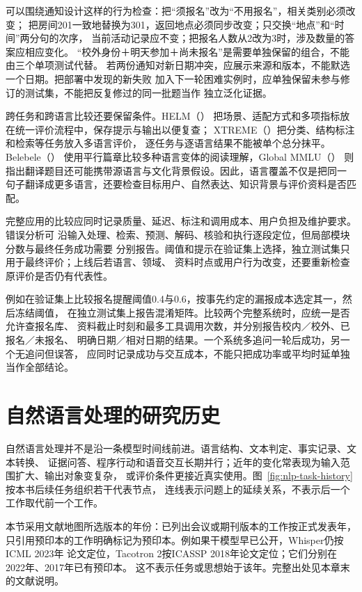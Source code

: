可以围绕通知设计这样的行为检查：把“须报名”改为“不用报名”，相关类别必须改变；
把房间201一致地替换为301，返回地点必须同步改变；只交换“地点”和“时间”两分句的次序，
当前活动记录应不变；把报名人数从2改为3时，涉及数量的答案应相应变化。
“校外身份＋明天参加＋尚未报名”是需要单独保留的组合，不能由三个单项测试代替。
若两份通知对新日期冲突，应展示来源和版本，不能默选一个日期。把部署中发现的新失败
加入下一轮困难实例时，应单独保留未参与修订的测试集，不能把反复修过的同一批题当作
独立泛化证据。

跨任务和跨语言比较还要保留条件。HELM（\citeyear{nlp-intro-liang2023helm}）
把场景、适配方式和多项指标放在统一评价流程中，保存提示与输出以便复查；
XTREME（\citeyear{hu2020xtreme}）把分类、结构标注和检索等任务放入多语言评价，
逐任务与逐语言结果不能被单个总分抹平。Belebele（\citeyear{bandarkar2024belebele}）
使用平行篇章比较多种语言变体的阅读理解，Global MMLU（\citeyear{singh2025globalmmlu}）
则指出翻译题目还可能携带源语言与文化背景假设。因此，语言覆盖不仅是把同一
句子翻译成更多语言，还要检查目标用户、自然表达、知识背景与评价资料是否匹配。

完整应用的比较应同时记录质量、延迟、标注和调用成本、用户负担及维护要求。错误分析可
沿输入处理、检索、预测、解码、核验和执行逐段定位，但局部模块分数与最终任务成功需要
分别报告。阈值和提示在验证集上选择，独立测试集只用于最终评价；上线后若语言、领域、
资料时点或用户行为改变，还要重新检查原评价是否仍有代表性。

例如在验证集上比较报名提醒阈值0.4与0.6，按事先约定的漏报成本选定其一，然后冻结阈值，
在独立测试集上报告混淆矩阵。比较两个完整系统时，应统一是否允许查报名库、
资料截止时刻和最多工具调用次数，并分别报告校内／校外、已报名／未报名、
明确日期／相对日期的结果。一个系统多追问一轮后成功，另一个无追问但误答，
应同时记录成功与交互成本，不能只把成功率或平均时延单独当作全部结论。

\section{自然语言处理的研究历史}
\label{sec:nlp-research-history}

自然语言处理并不是沿一条模型时间线前进。语言结构、文本判定、事实记录、文本转换、
证据问答、程序行动和语音交互长期并行；近年的变化常表现为输入范围扩大、输出对象变复杂，
或评价条件更接近真实使用。图~\ref{fig:nlp-task-history}按本书后续任务组织若干代表节点，
连线表示问题上的延续关系，不表示后一个工作取代前一个工作。

本节采用文献地图所选版本的年份：已列出会议或期刊版本的工作按正式发表年，
只引用预印本的工作明确标记为预印本。例如果干模型早已公开，Whisper仍按ICML 2023年
论文定位，Tacotron 2按ICASSP 2018年论文定位；它们分别在2022年、2017年已有预印本。
这不表示任务或思想始于该年。完整出处见本章末的文献说明。

